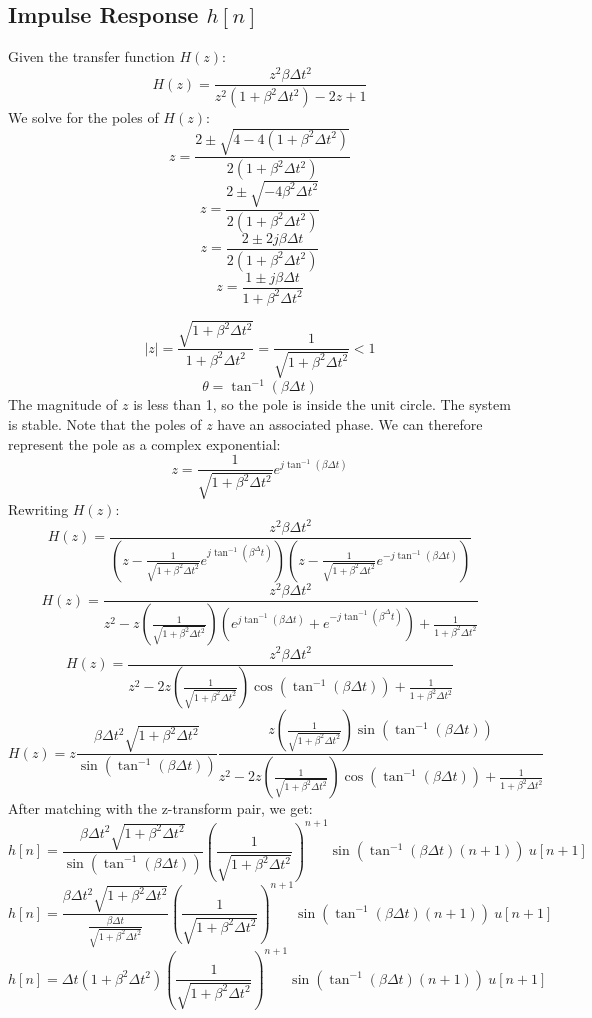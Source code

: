 \documentclass{article}
\begin{document}
\subsection*{Impulse Response \(h[n]\)}
Given the transfer function \(H(z)\):
\[
H(z) = \frac{z^2 \beta \Delta t^2}{z^2 (1+\beta^2 \Delta t^2) -2z + 1}
\]
We solve for the poles of \(H(z)\):
\[
z = \frac{2 \pm \sqrt{4-4(1+\beta^2 \Delta t^2)}}{2(1+\beta^2 \Delta t^2)}
\]
\[
z = \frac{2 \pm \sqrt{-4\beta^2 \Delta t^2}}{2(1+\beta^2 \Delta t^2)}
\]
\[
z = \frac{2 \pm 2j \beta \Delta t}{2(1+\beta^2 \Delta t^2)}
\]
\[
z = \frac{1 \pm j \beta \Delta t}{1+\beta^2 \Delta t^2}
\]

\[
|z| = \frac{\sqrt{1 + \beta^2 \Delta t^2}}{1+\beta^2 \Delta t^2} = \frac{1}{\sqrt{1 + \beta^2 \Delta t^2}} < 1
\]
\[
\theta = \tan^{-1}(\beta \Delta t)
\]
The magnitude of \(z\) is less than 1, so the pole is inside the unit circle. The system is stable. Note that the poles of \(z\) have an associated phase. We can therefore represent the pole as a complex exponential:
\[
z = \frac{1}{\sqrt{1+\beta^2 \Delta t^2}}e^{j \tan^{-1}(\beta \Delta t)}
\]
Rewriting \(H(z)\):
\[
H(z) = \frac{z^2 \beta \Delta t^2}
{(z - \frac{1}{\sqrt{1+\beta^2 \Delta t^2}}e^{j \tan^{-1}(\beta^ \Delta t)})(z - \frac{1}{\sqrt{1+\beta^2 \Delta t^2}}e^{-j \tan^{-1}(\beta \Delta t)})}
\]
\[
H(z) = \frac{z^2 \beta \Delta t^2}
{z^2 - z(\frac{1}{\sqrt{1+\beta^2 \Delta t^2}})(e^{j \tan^{-1}(\beta \Delta t)}+e^{-j \tan^{-1}(\beta^ \Delta t)}) + \frac{1}{1 + \beta^2 \Delta t^2} }
\]
\[
H(z) = \frac{z^2 \beta \Delta t^2}{z^2 - 2z(\frac{1}{\sqrt{1+\beta^2 \Delta t^2}}) \cos(\tan^{-1}(\beta \Delta t)) + \frac{1}{1+\beta^2 \Delta t^2} }
\]
\[
H(z) = z \frac{\beta \Delta t^2 \sqrt{1+\beta^2 \Delta t^2}}{\sin(\tan^{-1}(\beta \Delta t))} 
\frac{z(\frac{1}{\sqrt{1+\beta^2 \Delta t^2}})\sin(\tan^{-1}(\beta \Delta t)) }{z^2 - 2z(\frac{1}{\sqrt{1+\beta^2 \Delta t^2}}) \cos(\tan^{-1}(\beta \Delta t)) + \frac{1}{1+\beta^2 \Delta t^2} }
\]
After matching with the z-transform pair, we get:
\[
h[n] = \frac{\beta \Delta t^2 \sqrt{1+\beta^2 \Delta t^2}}{\sin(\tan^{-1}(\beta \Delta t))}
(\frac{1}{\sqrt{1+\beta^2 \Delta t^2}})^{n+1} \sin(\tan^{-1}(\beta \Delta t)(n+1)) \ u[n+1]
\]
\[
h[n] = \frac{\beta \Delta t^2 \sqrt{1+\beta^2 \Delta t^2}}{\frac{\beta \Delta t}{\sqrt{1+\beta^2 \Delta t^2}}}
(\frac{1}{\sqrt{1+\beta^2 \Delta t^2}})^{n+1} \sin(\tan^{-1}(\beta \Delta t)(n+1)) \ u[n+1]
\]
\[
h[n] = \Delta t (1 +\beta^2 \Delta t^2)
(\frac{1}{\sqrt{1+\beta^2 \Delta t^2}})^{n+1} \sin(\tan^{-1}(\beta \Delta t)(n+1)) \ u[n+1]
\]
\pagebreak 
\end{document}
